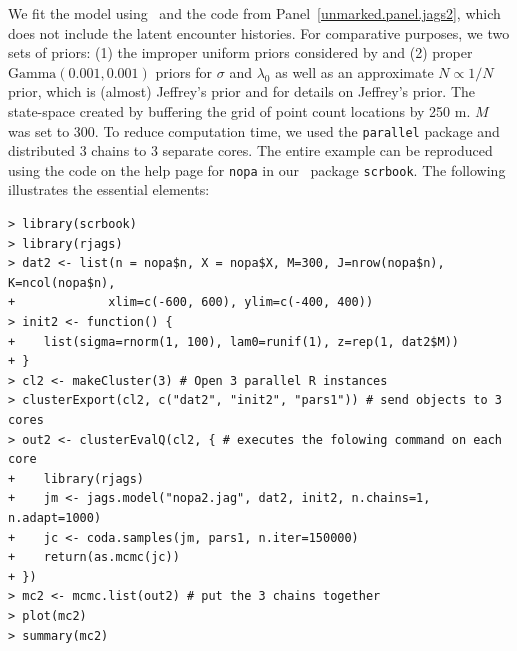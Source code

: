 We fit the model using \jags~and the code from
Panel~\ref{unmarked.panel.jags2}, which does not include the latent
encounter histories. For comparative purposes, we two sets of priors:
(1) the improper uniform priors considered by
\citet{chandler_royle:2012} and (2) proper $\text{Gamma}(0.001,0.001)$
priors for $\sigma$ and $\lambda_0$ as well as an approximate
$N \propto 1/N$ prior, which is (almost) Jeffrey's prior
\citet[see][]{link:2013} and \citet{link_barker:2010} for details on Jeffrey's
prior.
The state-space created by buffering the grid of point count
locations by 250 m. $M$ was set to 300.
To reduce computation time, we used the \texttt{parallel} package and
distributed 3 chains to 3 separate cores. The entire example can be
reproduced using the code on the help page for \verb+nopa+ in our
\R~package \texttt{scrbook}. The following illustrates the essential
elements:
\begin{small}
\begin{verbatim}
> library(scrbook)
> library(rjags)
> dat2 <- list(n = nopa$n, X = nopa$X, M=300, J=nrow(nopa$n), K=ncol(nopa$n),
+             xlim=c(-600, 600), ylim=c(-400, 400))
> init2 <- function() {
+    list(sigma=rnorm(1, 100), lam0=runif(1), z=rep(1, dat2$M))
+ }
> cl2 <- makeCluster(3) # Open 3 parallel R instances
> clusterExport(cl2, c("dat2", "init2", "pars1")) # send objects to 3 cores
> out2 <- clusterEvalQ(cl2, { # executes the folowing command on each core
+    library(rjags)
+    jm <- jags.model("nopa2.jag", dat2, init2, n.chains=1, n.adapt=1000)
+    jc <- coda.samples(jm, pars1, n.iter=150000)
+    return(as.mcmc(jc))
+ })
> mc2 <- mcmc.list(out2) # put the 3 chains together
> plot(mc2)
> summary(mc2)
\end{verbatim}
\end{small}




